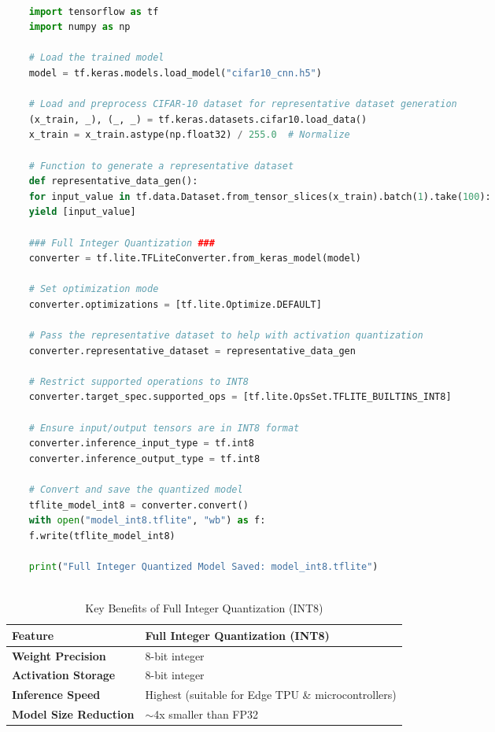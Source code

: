 \begin{lstlisting}[language=Python, caption=Full Integer Quantization for TensorFlow Model,style=pythonstyle, label={lst:full_integer_quantization}]
	
	import tensorflow as tf
	import numpy as np
	
	# Load the trained model
	model = tf.keras.models.load_model("cifar10_cnn.h5")
	
	# Load and preprocess CIFAR-10 dataset for representative dataset generation
	(x_train, _), (_, _) = tf.keras.datasets.cifar10.load_data()
	x_train = x_train.astype(np.float32) / 255.0  # Normalize
	
	# Function to generate a representative dataset
	def representative_data_gen():
	for input_value in tf.data.Dataset.from_tensor_slices(x_train).batch(1).take(100):
	yield [input_value]
	
	### Full Integer Quantization ###
	converter = tf.lite.TFLiteConverter.from_keras_model(model)
	
	# Set optimization mode
	converter.optimizations = [tf.lite.Optimize.DEFAULT]
	
	# Pass the representative dataset to help with activation quantization
	converter.representative_dataset = representative_data_gen
	
	# Restrict supported operations to INT8
	converter.target_spec.supported_ops = [tf.lite.OpsSet.TFLITE_BUILTINS_INT8]
	
	# Ensure input/output tensors are in INT8 format
	converter.inference_input_type = tf.int8
	converter.inference_output_type = tf.int8
	
	# Convert and save the quantized model
	tflite_model_int8 = converter.convert()
	with open("model_int8.tflite", "wb") as f:
	f.write(tflite_model_int8)
	
	print("Full Integer Quantized Model Saved: model_int8.tflite")
	
\end{lstlisting}
\begin{table}[h!]
	\centering
	\begin{tabular}{|l|l|}
		\hline
		\textbf{Feature} & \textbf{Full Integer Quantization (INT8)} \\
		\hline
		\textbf{Weight Precision} & 8-bit integer \\
		\hline
		\textbf{Activation Storage} & 8-bit integer \\
		\hline
		\textbf{Inference Speed} & Highest (suitable for Edge TPU \& microcontrollers) \\
		\hline
		\textbf{Model Size Reduction} & $\sim$4x smaller than FP32 \\
		\hline
	\end{tabular}
	\caption{Key Benefits of Full Integer Quantization (INT8)}
\end{table}

